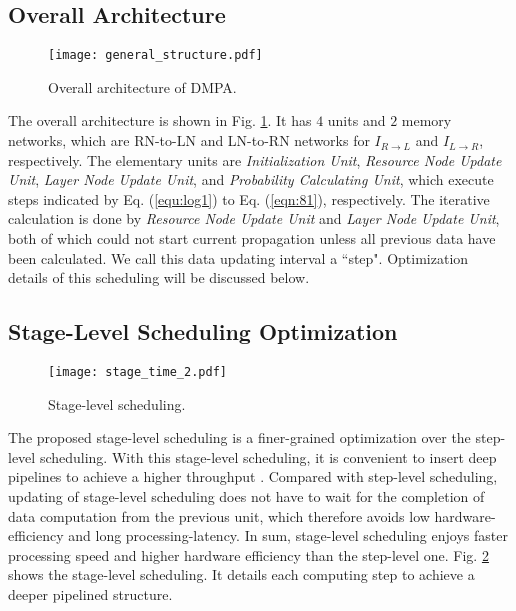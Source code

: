 \documentclass[journal,twoside]{IEEEtran}
\begin{document}
\subsection{Overall Architecture}
\begin{figure}[htbp]
\centering
\texttt{[image: general\_structure.pdf]}
\caption{Overall architecture of DMPA.}
\label{fig:General architecture of DMPA}
\end{figure}
The overall architecture is shown in Fig. \ref{fig:General architecture of DMPA}. It has $4$ units and $2$ memory networks, which are RN-to-LN and LN-to-RN networks for $I_{R\rightarrow L}$ and $I_{L\rightarrow R}$, respectively. The elementary units are \emph{Initialization Unit}, \emph{Resource Node Update Unit}, \emph{Layer Node Update Unit}, and \emph{Probability Calculating Unit}, which execute steps indicated by Eq. (\ref{equ:log1}) to Eq. (\ref{eqn:81}), respectively. The iterative calculation is done by \emph{Resource Node Update Unit} and \emph{Layer Node Update Unit}, both of which could not start current propagation unless all previous data have been calculated. We call this data updating interval a ``step". Optimization details of this scheduling will be discussed below.

\subsection{Stage-Level Scheduling Optimization}
\begin{figure}[htbp]
\centering
\texttt{[image: stage\_time\_2.pdf]}
\caption{Stage-level scheduling.}
\label{fig:Scheduling of stage-level}
\end{figure}
The proposed stage-level scheduling is a finer-grained optimization over the step-level scheduling. With this stage-level scheduling, it is convenient to insert deep pipelines to achieve a higher throughput \cite{simon1994new,monteiro1996retiming,parhi1992synthesis}. Compared with step-level scheduling, updating of stage-level scheduling does not have to wait for the completion of data computation from the previous unit, which therefore avoids low hardware-efficiency and long processing-latency. In sum, stage-level scheduling enjoys faster processing speed and higher hardware efficiency than the step-level one. Fig. \ref{fig:Scheduling of stage-level} shows the stage-level scheduling. It details each computing step to achieve a deeper pipelined structure.

%
\end{document}
